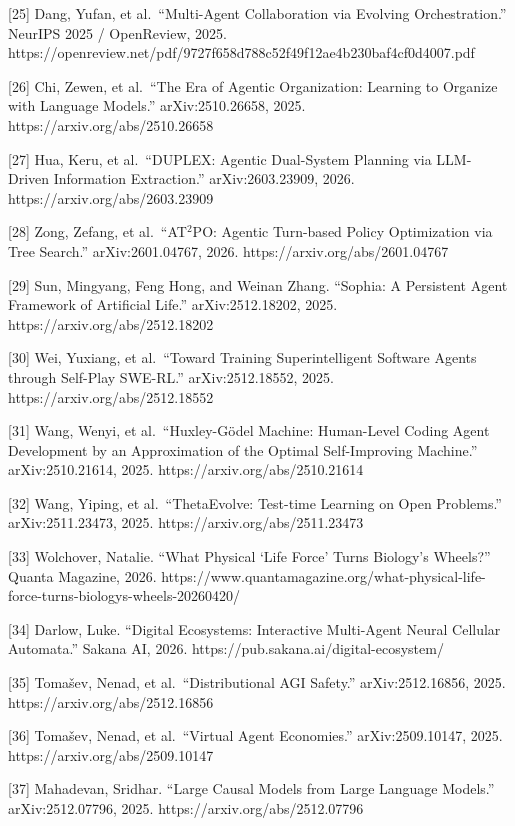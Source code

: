 \documentclass[
  11pt,
]{article}
\begin{document}
{[}25{]} Dang, Yufan, et al.~``Multi-Agent Collaboration via Evolving
Orchestration.'' NeurIPS 2025 / OpenReview, 2025.
https://openreview.net/pdf/9727f658d788c52f49f12ae4b230baf4cf0d4007.pdf

{[}26{]} Chi, Zewen, et al.~``The Era of Agentic Organization: Learning
to Organize with Language Models.'' arXiv:2510.26658, 2025.
https://arxiv.org/abs/2510.26658

{[}27{]} Hua, Keru, et al.~``DUPLEX: Agentic Dual-System Planning via
LLM-Driven Information Extraction.'' arXiv:2603.23909, 2026.
https://arxiv.org/abs/2603.23909

{[}28{]} Zong, Zefang, et al.~``AT\(^2\)PO: Agentic Turn-based Policy
Optimization via Tree Search.'' arXiv:2601.04767, 2026.
https://arxiv.org/abs/2601.04767

{[}29{]} Sun, Mingyang, Feng Hong, and Weinan Zhang. ``Sophia: A
Persistent Agent Framework of Artificial Life.'' arXiv:2512.18202, 2025.
https://arxiv.org/abs/2512.18202

{[}30{]} Wei, Yuxiang, et al.~``Toward Training Superintelligent
Software Agents through Self-Play SWE-RL.'' arXiv:2512.18552, 2025.
https://arxiv.org/abs/2512.18552

{[}31{]} Wang, Wenyi, et al.~``Huxley-Gödel Machine: Human-Level Coding
Agent Development by an Approximation of the Optimal Self-Improving
Machine.'' arXiv:2510.21614, 2025. https://arxiv.org/abs/2510.21614

{[}32{]} Wang, Yiping, et al.~``ThetaEvolve: Test-time Learning on Open
Problems.'' arXiv:2511.23473, 2025. https://arxiv.org/abs/2511.23473

{[}33{]} Wolchover, Natalie. ``What Physical `Life Force' Turns
Biology's Wheels?'' Quanta Magazine, 2026.
https://www.quantamagazine.org/what-physical-life-force-turns-biologys-wheels-20260420/

{[}34{]} Darlow, Luke. ``Digital Ecosystems: Interactive Multi-Agent
Neural Cellular Automata.'' Sakana AI, 2026.
https://pub.sakana.ai/digital-ecosystem/

{[}35{]} Tomašev, Nenad, et al.~``Distributional AGI Safety.''
arXiv:2512.16856, 2025. https://arxiv.org/abs/2512.16856

{[}36{]} Tomašev, Nenad, et al.~``Virtual Agent Economies.''
arXiv:2509.10147, 2025. https://arxiv.org/abs/2509.10147

{[}37{]} Mahadevan, Sridhar. ``Large Causal Models from Large Language
Models.'' arXiv:2512.07796, 2025. https://arxiv.org/abs/2512.07796
\end{document}
